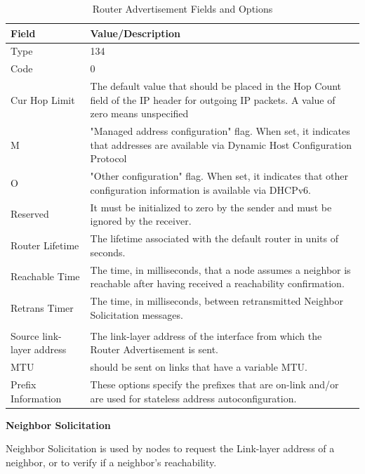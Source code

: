 \documentclass[12pt]{article}
\begin{document}
\begin{savenotes}
\begin{table}[!htpb]
\centering
\addtolength{\tabcolsep}{3pt}
\begin{tabular}{|L{3.0cm}|L{11.6cm}|}
\hline
Field&Value/Description\\
\hline
Type&134\\
\hline
Code&0\\
\hline
Cur Hop Limit&The default value that should be placed in the Hop Count field of the IP header for outgoing IP packets. A value of zero means unspecified\\
\hline
M&"Managed address configuration" flag. When set, it indicates that addresses are available via Dynamic Host Configuration Protocol\\
\hline
O&"Other configuration" flag. When set, it indicates that other configuration information is available via DHCPv6.\\
\hline
Reserved&It must be initialized to zero by the sender and must be ignored by the receiver.\\
\hline
Router Lifetime&The lifetime associated with the default router in units of seconds.\\
\hline
Reachable Time&The time, in milliseconds, that a node assumes a neighbor is reachable after having received a reachability confirmation.\\
\hline
Retrans Timer&The time, in milliseconds, between retransmitted Neighbor Solicitation messages.\\
\hline
{}
\\
\hline
Source link-layer address &The link-layer address of the interface from which the Router Advertisement is sent.\\
\hline
MTU&should be sent on links that have a variable MTU.\\
\hline
Prefix Information&These options specify the prefixes that are on-link and/or are used for stateless address autoconfiguration.\\
\hline
\end{tabular}
\caption{Router Advertisement Fields and Options}
\label{table:routerAdvfields}
\end{table}
\end{savenotes}

\textbf{Neighbor Solicitation}

Neighbor Solicitation is used by nodes to request the Link-layer address of a neighbor, or to verify if a neighbor's reachability.
\end{document}
